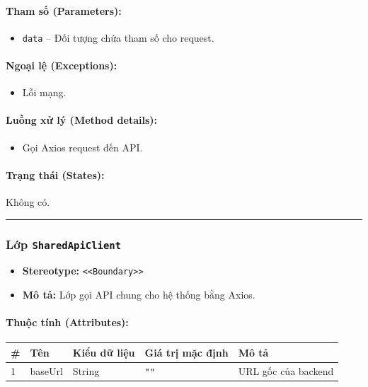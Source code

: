 \documentclass[12pt,a4paper]{article}
\begin{document}
\paragraph{Tham số (Parameters):}
\begin{itemize}[leftmargin=*]
    \item \texttt{data} – Đối tượng chứa tham số cho request.
\end{itemize}


\paragraph{Ngoại lệ (Exceptions):}
\begin{itemize}[leftmargin=*]
    \item Lỗi mạng.
\end{itemize}


\paragraph{Luồng xử lý (Method details):}
\begin{itemize}[leftmargin=*]
    \item Gọi Axios request đến API.
\end{itemize}


\paragraph{Trạng thái (States):}
Không có.

\vskip 0.5cm
\noindent\rule{\textwidth}{0.5pt}
\vskip 0.5cm

\subsubsection{Lớp \texttt{SharedApiClient}}

\begin{itemize}[leftmargin=*]
    \item \textbf{Stereotype:} \texttt{\textless{}\textless{}Boundary\textgreater{}\textgreater{}}
    \item \textbf{Mô tả:} Lớp gọi API chung cho hệ thống bằng Axios.
\end{itemize}

\paragraph{Thuộc tính (Attributes):}
\begin{longtable}{|p{0.6cm}|p{3.5cm}|p{2.4cm}|p{1.8cm}|p{5.1cm}|}
\hline
\textbf{\#} & \textbf{Tên} & \textbf{Kiểu dữ liệu} & \textbf{Giá trị mặc định} & \textbf{Mô tả} \\ \hline
\endhead
1 & baseUrl & String & \texttt{""} & URL gốc của backend \\ \hline
\end{longtable}
\end{document}
